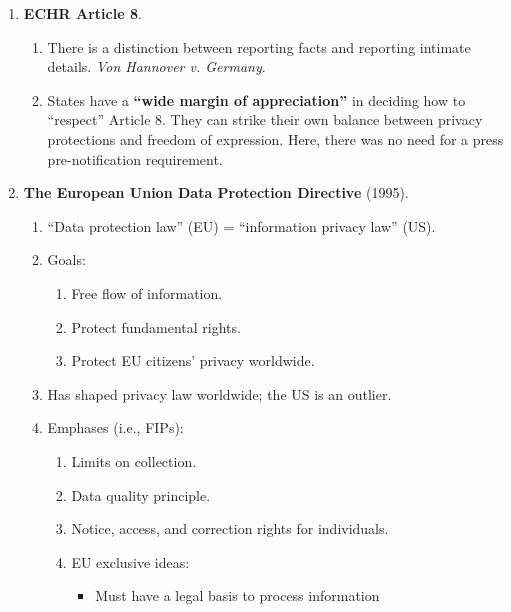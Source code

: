 \begin{enumerate}
\begin{enumerate}
\begin{enumerate}
{            1065--70.}
            \item Europe: personal dignity, respect, honor, 
            face-saving---e.g., no intrusive credit reports.
        \end{enumerate}
        \item \textbf{ECHR Article 8}.
        \begin{enumerate}
            \item There is a distinction between reporting facts and reporting 
            intimate details. \emph{Von Hannover v. Germany}.
            \item States have a \textbf{``wide margin of appreciation''} in 
            deciding how to ``respect'' Article 8. They can strike their own 
            balance between privacy protections and freedom of expression. 
            Here, there was no need for a press pre-notification requirement.
        \end{enumerate}
        \item \textbf{The European Union Data Protection Directive} (1995).
        \begin{enumerate}
            \item ``Data protection law'' (EU) = ``information privacy law'' 
            (US).
            \item Goals:
            \begin{enumerate}
                \item Free flow of information.
                \item Protect fundamental rights.
                \item Protect EU citizens' privacy worldwide.
            \end{enumerate}
            \item Has shaped privacy law worldwide; the US is an outlier.
            \item Emphases (i.e., FIPs):
            \begin{enumerate}
                \item Limits on collection.
                \item Data quality principle.
                \item Notice, access, and correction rights for individuals.
                \item EU exclusive ideas:
                \begin{itemize}
                    \item Must have a legal basis to process information 

\end{itemize}
\end{enumerate}
\end{enumerate}
\end{enumerate}
\end{enumerate}
